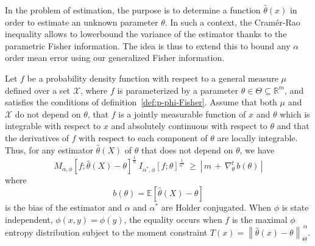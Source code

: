 \documentclass[entropy,article,submit,moreauthors,pdftex]{Definitions/mdpi}
\def\Rset{\mathbb{R}}%
\def\X{\mathcal{X}}%
\newcommand{\Esp}[1]{\mathbb{E}\left[ #1 \right]}%
\begin{document}
In  the  problem  of  estimation,  the   purpose  is  to  determine  a  function
$\hat{\theta}(x)$ in order to estimate an  unknown parameter $\theta$. In such a
context, the  Cram\'er-Rao inequality allows  to lowerbound the variance  of the
estimator thanks  to the  parametric Fisher  information.  The  idea is  thus to
extend this to bound any $\alpha$  order mean error using our generalized Fisher
information.
%
\begin{Proposition}
\label{prop:p-phi-CR}
  Let $f$  be a probability density  function with respect to  a general measure
  $\mu$  defined over  a set  $\X$, where  $f$ is  parameterized by  a parameter
  $\theta  \in  \Theta  \subseteq  \Rset^m$, and  satisfies  the  conditions  of
  definition~\ref{def:p-phi-Fisher}.   Assume that  both $\mu$  and $\X$  do not
  depend  on $\theta$,  that $f$  is a  jointly measurable  function of  $x$ and
  $\theta$ which  is integrable  with respect to  $x$ and  absolutely continuous
  with respect to $\theta$ and that the  derivatives of $f$ with respect to each
  component  of  $\theta$  are  locally integrable.   Thus,  for  any  estimator
  $\widehat{\theta}(X)$ of $\theta$ that does not depend on $\theta$, we have
  \begin{equation}\label{eq:phi-CR}
  M_{\alpha,\phi}    \!    \left[    f   ;    \widehat{\theta}(X)    -    \theta
    \right]^{\frac{1}{\alpha}}                                                \:
  I_{\alpha^*\!,\phi}[f;\theta]^{\frac{1}{\alpha^*}} \: \ge \:  \left| \, m \, +
  \, \nabla_\theta^t \, b(\theta) \, \right|
  \end{equation}
  where
  \begin{equation}
  b(\theta) = \Esp{\widehat{\theta}(X) - \theta}
  \end{equation}
  is  the  bias  of  the  estimator  and  $\alpha$  and  $\alpha^*$  are  Holder
  conjugated.   When $\phi$  is state  independent, $\phi(x,y)  = \phi(y)$,  the
  equality occurs when $f$ is the maximal $\phi$ entropy distribution subject to
  the   moment  constraint   $T(x)  =   \left\|  \widehat{\theta}(x)   -  \theta
  \right\|_{\Theta}^{\, \alpha}$.
\end{Proposition}
%
\end{document}
